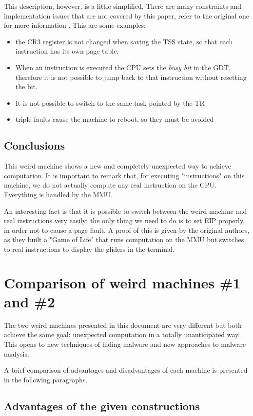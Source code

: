\documentclass[11pt,twoside,a4paper]{article}
\begin{document}
This description, however, is a little simplified. There are many constraints and implementation issues that are not covered by this paper, refer to the original one for more information \cite{mmu_machine}. This are some examples:
\begin{itemize}
\item the CR3 register is not changed when saving the TSS state, so that each instruction has its own page table.
\item When an instruction is executed the CPU sets the \emph{busy bit} in the GDT, therefore it is not possible to jump back to that instruction without resetting the bit.
\item It is not possible to switch to the same task pointed by the TR
\item triple faults cause the machine to reboot, so they must be avoided
\end{itemize}


\subsection{Conclusions}
This weird machine shows a new and completely unexpected way to achieve computation.
It is important to remark that, for executing "instructions" on this machine, we do not actually compute any real instruction on the CPU. Everything is handled by the MMU. 

An interesting fact is that it is possible to switch between the weird machine and real instructions very easily: the only thing we need to do is to set EIP properly, in order not to cause a page fault. A proof of this is given by the original authors, as they built a "Game of Life" that runs computation on the MMU but switches to real instructions to display the gliders in the terminal.


\section{Comparison of weird machines \#1 and \#2}

The two weird machines presented in this document are very different but both achieve the same goal: unexpected computation in a totally unanticipated way. This opens to new techniques of hiding malware and new approaches to malware analysis.

A brief comparison of advantages and disadvantages of each machine is presented in the following paragraphs.

\subsection{Advantages of the given constructions}
\end{document}
